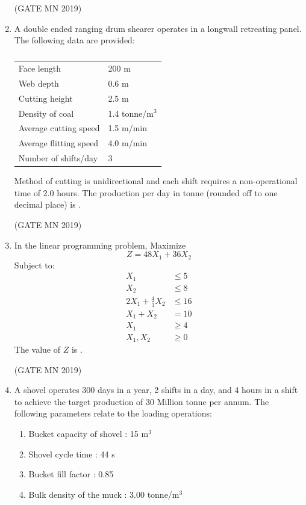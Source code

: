 \documentclass[journal]{IEEEtran}
\begin{document}
\begin{enumerate}
\hfill(GATE MN 2019)
\item A double ended ranging drum shearer operates in a longwall retreating panel. The following data are provided:

  \begin{table}[H]
    \centering\normalsize
\begin{tabular}{ll}

Face length & 200 m \\
Web depth & 0.6 m \\
Cutting height & 2.5 m \\
Density of coal & 1.4 tonne/m$^3$ \\
Average cutting speed & 1.5 m/min \\
Average flitting speed & 4.0 m/min \\
Number of shifts/day & 3 \\

\end{tabular}

\caption{}
    \label{tab:Q46}
\end{table}
Method of cutting is unidirectional and each shift requires a non-operational time of 2.0 hours. The production per day in tonne (rounded off to one decimal place) is \underline{\hspace{3cm}}.


\hfill(GATE MN 2019)
\item In the linear programming problem,  
Maximize \[ Z = 48X_{1} + 36X_{2} \]  
Subject to:  
\[
\begin{aligned}
X_{1} &\leq 5 \\
X_{2} &\leq 8 \\
2X_{1} + \tfrac{4}{3}X_{2} &\leq 16 \\
X_{1} + X_{2} &= 10 \\
X_{1} &\geq 4 \\
X_{1}, X_{2} &\geq 0
\end{aligned}
\]  
The value of $Z$ is \underline{\hspace{2cm}}.  


\hfill(GATE MN 2019)

\item A shovel operates 300 days in a year, 2 shifts in a day, and 4 hours in a shift to achieve the target production of 30 Million tonne per annum. The following parameters relate to the loading operations:  


\begin{enumerate}
\item Bucket capacity of shovel : 15 m$^{3}$
\item Shovel cycle time : 44 s
\item Bucket fill factor : 0.85
\item Bulk density of the muck : 3.00 tonne/m$^{3}$
\end{enumerate}



\end{enumerate}
\end{document}
